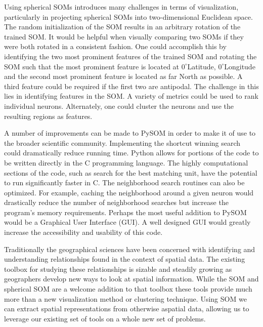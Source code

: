 Using spherical SOMs introduces many challenges in terms of visualization,
particularly in projecting spherical SOMs into two-dimensional Euclidean
space.  The random initialization of the SOM results in an arbitrary rotation of
the trained SOM.  It would be helpful when visually comparing two SOMs if they
were both rotated in a consistent fashion. One could accomplish this by identifying
the two most prominent features of the trained SOM and rotating the SOM such
that the most prominent feature is located at $0^\circ$Latitude,
$0^\circ$Longitude and the second most prominent feature is located as far North
as possible. A third feature could be required if the first two are antipodal.
The challenge in this lies in identifying features in the SOM.  A variety of
metrics could be used to rank individual neurons. Alternately, one could cluster
the neurons and use the resulting regions as features.

A number of improvements can be made to PySOM in order to make it of use to
the broader scientific community.  Implementing the shortcut winning search
could dramatically reduce running time.  Python allows for portions of the code
to be written directly in the C programming language.  The highly computational
sections of the code, such as search for the best matching unit, have the
potential to run significantly faster in C.  
The neighborhood search routines can also be optimized. For example, caching the neighborhood around a given neuron
would drastically reduce the number of neighborhood searches but increase the
program's memory requirements.  Perhaps the most useful addition to PySOM would
be a Graphical User Interface (GUI).  A well designed GUI would greatly increase the
accessibility and usability of this code.

Traditionally the geographical sciences have been concerned with identifying and
understanding relationships found in the context of spatial data.  
The existing toolbox for studying these relationships is sizable 
and steadily growing as geographers develop new ways to look at spatial
information.  While the SOM and spherical SOM are a welcome addition to that
toolbox these tools provide much more than a new visualization method or
clustering technique.  Using SOM we can extract spatial representations from
otherwise aspatial data, allowing us to leverage our existing set of
tools on a whole new set of problems.



